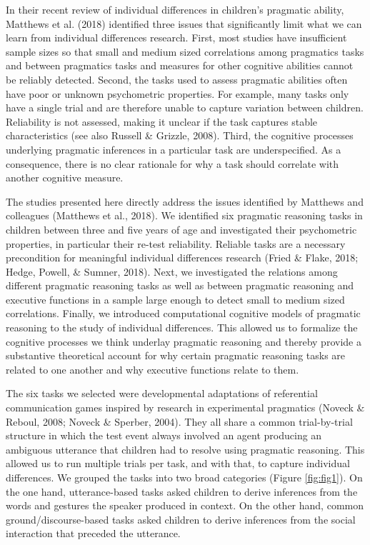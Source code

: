 \documentclass[
  english,
  man,floatsintext]{apa6}
\begin{document}
In their recent review of individual differences in children's pragmatic ability, Matthews et al. (2018) identified three issues that significantly limit what we can learn from individual differences research. First, most studies have insufficient sample sizes so that small and medium sized correlations among pragmatics tasks and between pragmatics tasks and measures for other cognitive abilities cannot be reliably detected. Second, the tasks used to assess pragmatic abilities often have poor or unknown psychometric properties. For example, many tasks only have a single trial and are therefore unable to capture variation between children. Reliability is not assessed, making it unclear if the task captures stable characteristics (see also Russell \& Grizzle, 2008). Third, the cognitive processes underlying pragmatic inferences in a particular task are underspecified. As a consequence, there is no clear rationale for why a task should correlate with another cognitive measure.

The studies presented here directly address the issues identified by Matthews and colleagues (Matthews et al., 2018). We identified six pragmatic reasoning tasks in children between three and five years of age and investigated their psychometric properties, in particular their re-test reliability. Reliable tasks are a necessary precondition for meaningful individual differences research (Fried \& Flake, 2018; Hedge, Powell, \& Sumner, 2018). Next, we investigated the relations among different pragmatic reasoning tasks as well as between pragmatic reasoning and executive functions in a sample large enough to detect small to medium sized correlations. Finally, we introduced computational cognitive models of pragmatic reasoning to the study of individual differences. This allowed us to formalize the cognitive processes we think underlay pragmatic reasoning and thereby provide a substantive theoretical account for why certain pragmatic reasoning tasks are related to one another and why executive functions relate to them.

The six tasks we selected were developmental adaptations of referential communication games inspired by research in experimental pragmatics (Noveck \& Reboul, 2008; Noveck \& Sperber, 2004). They all share a common trial-by-trial structure in which the test event always involved an agent producing an ambiguous utterance that children had to resolve using pragmatic reasoning. This allowed us to run multiple trials per task, and with that, to capture individual differences. We grouped the tasks into two broad categories (Figure \ref{fig:fig1}). On the one hand, utterance-based tasks asked children to derive inferences from the words and gestures the speaker produced in context. On the other hand, common ground/discourse-based tasks asked children to derive inferences from the social interaction that preceded the utterance.
\end{document}
